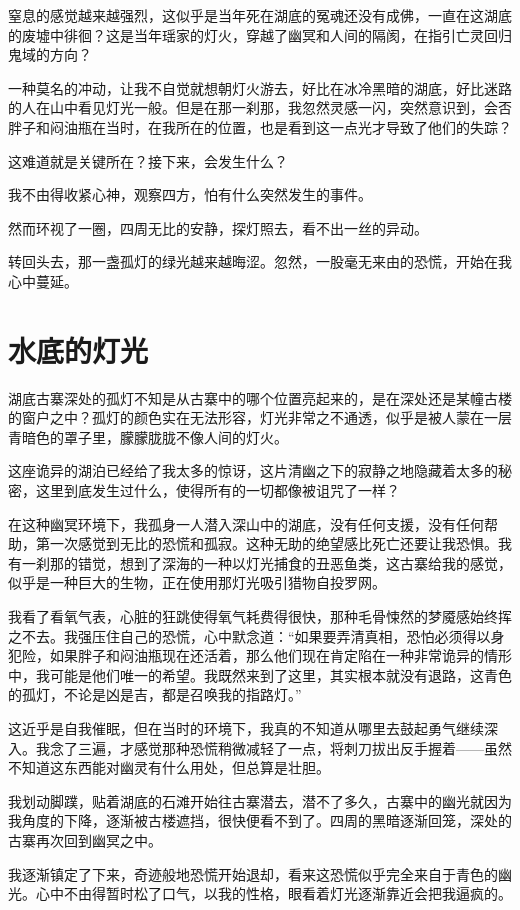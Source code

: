 窒息的感觉越来越强烈，这似乎是当年死在湖底的冤魂还没有成佛，一直在这湖底的废墟中徘徊？这是当年瑶家的灯火，穿越了幽冥和人间的隔阂，在指引亡灵回归鬼域的方向？

一种莫名的冲动，让我不自觉就想朝灯火游去，好比在冰冷黑暗的湖底，好比迷路的人在山中看见灯光一般。但是在那一刹那，我忽然灵感一闪，突然意识到，会否胖子和闷油瓶在当时，在我所在的位置，也是看到这一点光才导致了他们的失踪？

这难道就是关键所在？接下来，会发生什么？

我不由得收紧心神，观察四方，怕有什么突然发生的事件。

然而环视了一圈，四周无比的安静，探灯照去，看不出一丝的异动。

转回头去，那一盏孤灯的绿光越来越晦涩。忽然，一股毫无来由的恐慌，开始在我心中蔓延。

\chapter{水底的灯光}

湖底古寨深处的孤灯不知是从古寨中的哪个位置亮起来的，是在深处还是某幢古楼的窗户之中？孤灯的颜色实在无法形容，灯光非常之不通透，似乎是被人蒙在一层青暗色的罩子里，朦朦胧胧不像人间的灯火。

这座诡异的湖泊已经给了我太多的惊讶，这片清幽之下的寂静之地隐藏着太多的秘密，这里到底发生过什么，使得所有的一切都像被诅咒了一样？

在这种幽冥环境下，我孤身一人潜入深山中的湖底，没有任何支援，没有任何帮助，第一次感觉到无比的恐慌和孤寂。这种无助的绝望感比死亡还要让我恐惧。我有一刹那的错觉，想到了深海的一种以灯光捕食的丑恶鱼类，这古寨给我的感觉，似乎是一种巨大的生物，正在使用那灯光吸引猎物自投罗网。

我看了看氧气表，心脏的狂跳使得氧气耗费得很快，那种毛骨悚然的梦魇感始终挥之不去。我强压住自己的恐慌，心中默念道：“如果要弄清真相，恐怕必须得以身犯险，如果胖子和闷油瓶现在还活着，那么他们现在肯定陷在一种非常诡异的情形中，我可能是他们唯一的希望。我既然来到了这里，其实根本就没有退路，这青色的孤灯，不论是凶是吉，都是召唤我的指路灯。”

这近乎是自我催眠，但在当时的环境下，我真的不知道从哪里去鼓起勇气继续深入。我念了三遍，才感觉那种恐慌稍微减轻了一点，将刺刀拔出反手握着——虽然不知道这东西能对幽灵有什么用处，但总算是壮胆。

我划动脚蹼，贴着湖底的石滩开始往古寨潜去，潜不了多久，古寨中的幽光就因为我角度的下降，逐渐被古楼遮挡，很快便看不到了。四周的黑暗逐渐回笼，深处的古寨再次回到幽冥之中。

我逐渐镇定了下来，奇迹般地恐慌开始退却，看来这恐慌似乎完全来自于青色的幽光。心中不由得暂时松了口气，以我的性格，眼看着灯光逐渐靠近会把我逼疯的。


